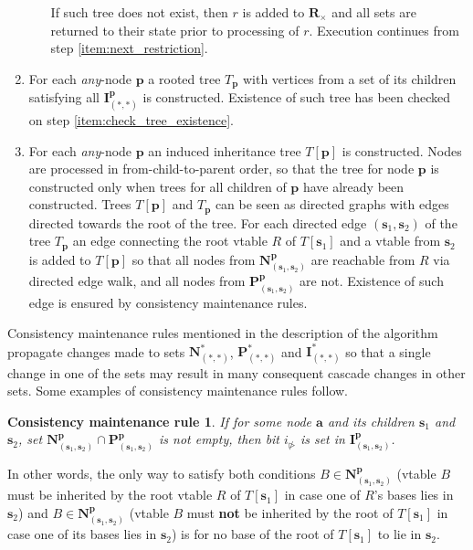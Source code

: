 \documentclass[10pt, conference]{IEEEtran}
\newcommand{\ib}[1]{\textbf{#1}}
\newcommand{\gR}{\ib{R}}
\newcommand{\gRx}{\gR_{\times}}
\newcommand{\gI}{\ib{I}}
\newcommand{\gN}{\ib{N}}
\newcommand{\gP}{\ib{P}}
\newcommand{\gp}{\ib{p}}
\newcommand{\gs}{\ib{s}}
\newcommand{\ga}{\ib{a}}
\newcommand{\inrhd}{i_{\nrhd}}
\newcommand{\any}{\textit{any}}
\newcommand{\nrhd}{\ntriangleright}
\newtheorem{cmr}{Consistency maintenance rule}
\newcommand{\compact}{}
\begin{document}
\begin{enumerate}
\begin{enumerate}
        If such tree does not exist, then $r$ is added to $\gRx$ and
        all sets are returned to their state prior to processing of $r$.
        Execution continues from step \ref{item:next_restriction}.
    \end{enumerate}
\item \label{item:build_child_trees}
    For each \any-node $\gp$ a rooted tree $T_{\gp}$ with vertices from a set
    of its children satisfying all $\gI^{\gp}_{(*, *)}$ is constructed.
    Existence of such tree has been checked on step \ref{item:check_tree_existence}.
\item \label{item:build_sol}
    For each \any-node $\gp$ an induced inheritance tree $T[\gp]$ is
    constructed. Nodes are processed in from-child-to-parent order, so that
    the tree for node $\gp$ is constructed only when trees for all children
    of $\gp$ have already been constructed.
    Trees $T[\gp]$ and $T_{\gp}$ can be seen as directed graphs
    with edges directed towards the root of the tree.
    For each directed edge $(\gs_1, \gs_2)$ of the tree $T_{\gp}$
    an edge connecting the root vtable $R$ of $T[\gs_1]$ and a vtable
    from $\gs_2$ is added to $T[\gp]$ so that all nodes from
    $\gN^{\gp}_{(\gs_1, \gs_2)}$ are reachable from $R$ via directed
    edge walk, and all nodes from $\gP^{\gp}_{(\gs_1, \gs_2)}$ are not.
    Existence of such edge is ensured by consistency maintenance rules.
\end{enumerate}

Consistency maintenance rules mentioned in the description of the algorithm
propagate changes made to sets $\gN^{*}_{(*, *)}$, $\gP^{*}_{(*, *)}$ and
$\gI^{*}_{(*, *)}$ so that a single change in one of the sets may result
in many consequent cascade changes in other sets. Some examples
of consistency maintenance rules follow.

\begin{cmr}
If for some node {\em $\ga$} and its children {\em $\gs_1$} and {\em $\gs_2$},
set {\em $\gN^{\gp}_{(\gs_1, \gs_2)} \cap \gP^{\gp}_{(\gs_1, \gs_2)}$}
is not empty, then bit $\inrhd$ is set in {\em $\gI^{\gp}_{(\gs_1, \gs_2)}$}.
\end{cmr}
In other words, the only way to satisfy both conditions
$B \in \gN^{\gp}_{(\gs_1, \gs_2)}$ (vtable $B$ must be inherited by the root vtable $R$
of $T[\gs_1]$ in case one of $R$'s bases lies in $\gs_2$) and
$B \in \gN^{\gp}_{(\gs_1, \gs_2)}$ (vtable $B$ must \textbf{not} be inherited by the root
of $T[\gs_1]$ in case one of its bases lies in $\gs_2$) is for no
base of the root of $T[\gs_1]$ to lie in $\gs_2$.
\end{document}
